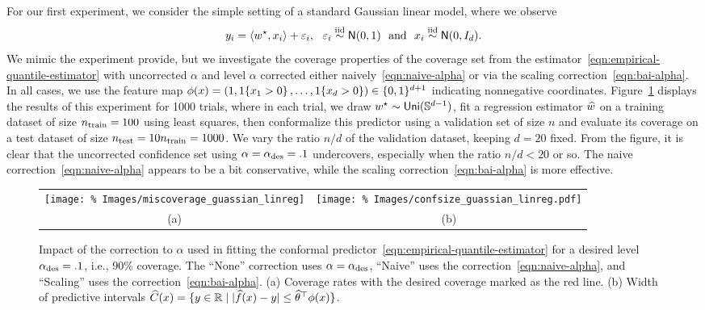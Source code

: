 \documentclass{article}
\begin{document}

\newcommand{\noise}{\varepsilon}

For our first experiment, we consider the simple setting of
a standard Gaussian linear model, where we observe
\begin{equation*}
  y_i = \<w\opt, x_i\> + \noise_i,
  ~~ \noise_i \simiid \normal(0, 1)
  ~~ \mbox{and} ~~ x_i \simiid \normal(0, I_d).
\end{equation*}
We mimic the experiment \citet[Fig.~3]{GibbsChCa25} provide,
but we investigate the coverage properties of the
coverage set from the estimator~\eqref{eqn:empirical-quantile-estimator}
with uncorrected $\alpha$ and level $\alpha$ corrected
either naively~\eqref{eqn:naive-alpha} or via the scaling
correction~\eqref{eqn:bai-alpha}.
%
In all cases, we use the feature map $\phi(x) = (1, 1\!\left\{x_1 > 0\right\}, \ldots,
1\!\left\{x_d > 0\right\}) \in \{0, 1\}^{d + 1}$ indicating nonnegative coordinates.
%
Figure~\ref{fig:simulation-correction-coverage} displays the results of this
experiment for 1000 trials, where in each trial, we draw $w^\star \sim
\mathsf{Uni}(\mathbb{S}^{d-1})$, fit a regression estimator $\widehat{w}$ on a
training dataset of size $n_{\textup{train}} = 100$ using least squares,
then conformalize this predictor using a validation set of size $n$ and
evaluate its coverage on a test dataset of size $n_{\textup{test}} = 10
n_{\textup{train}} = 1000$.
%
We vary the
ratio $n / d$ of the validation dataset, keeping $d = 20$ fixed.
%
From the figure, it is clear that the uncorrected confidence
set using $\alpha = \alpha_{\textup{des}} = .1$
undercovers, especially when the ratio $n/d < 20$ or so.
%
The naive correction~\eqref{eqn:naive-alpha} appears to be a bit
conservative, while the scaling correction~\eqref{eqn:bai-alpha}
is more effective.

\begin{figure}[ht]
  \begin{center}
    \begin{tabular}{cc}
      \hspace{-1cm}
      \texttt{[image: \%
        Images/miscoverage\_guassian\_linreg]} &
      \hspace{-.5cm}
      \texttt{[image: \%
        Images/confsize\_guassian\_linreg.pdf]} \\
      (a) & (b)
    \end{tabular}
    \caption{\label{fig:simulation-correction-coverage} Impact of the
      correction to $\alpha$ used in fitting the conformal
      predictor~\eqref{eqn:empirical-quantile-estimator} for a desired level
      $\alpha_{\textup{des}} = .1$, i.e., 90\% coverage. The ``None'' correction
      uses $\alpha = \alpha_{\textup{des}}$, ``Naive'' uses the
      correction~\eqref{eqn:naive-alpha}, and ``Scaling'' uses the
      correction~\eqref{eqn:bai-alpha}.  (a) Coverage rates with the desired
      coverage marked as the red line. (b) Width of predictive intervals
      $\widehat{C}(x) = \{y \in \mathbb{R} \mid |\widehat{f}(x) - y| \le
      \widehat{\theta}^\top \phi(x)\}$.}
  \end{center}
\end{figure}
\end{document}
